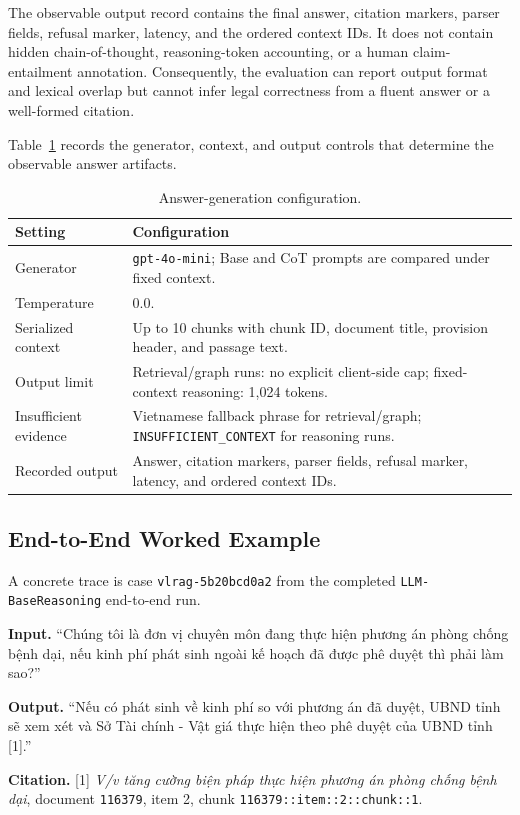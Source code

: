 The observable output record contains the final answer, citation markers,
parser fields, refusal marker, latency, and the ordered context IDs. It does
not contain hidden chain-of-thought, reasoning-token accounting, or a human
claim-entailment annotation. Consequently, the evaluation can report output
format and lexical overlap but cannot infer legal correctness from a fluent
answer or a well-formed citation.

Table~\ref{tab:generation-config} records the generator, context, and output
controls that determine the observable answer artifacts.

\begin{table}[t]
\centering
\scriptsize
\caption{Answer-generation configuration.}
\label{tab:generation-config}
\begin{tabularx}{\columnwidth}{@{}p{}X@{}}
\toprule
\textbf{Setting} & \textbf{Configuration} \\
\midrule
Generator & \texttt{gpt-4o-mini}; Base and CoT prompts are compared under fixed context. \\
Temperature & $0.0$. \\
Serialized context & Up to 10 chunks with chunk ID, document title, provision header, and passage text. \\
Output limit & Retrieval/graph runs: no explicit client-side cap; fixed-context reasoning: 1,024 tokens. \\
Insufficient evidence & Vietnamese fallback phrase for retrieval/graph; \texttt{INSUFFICIENT\_CONTEXT} for reasoning runs. \\
Recorded output & Answer, citation markers, parser fields, refusal marker, latency, and ordered context IDs. \\
\bottomrule
\end{tabularx}
\end{table}

\subsection{End-to-End Worked Example}
\label{sec:worked-example}

A concrete trace is case \texttt{vlrag-5b20bcd0a2} from the completed
\texttt{LLM-BaseReasoning} end-to-end run.

\textbf{Input.} ``Chúng tôi là đơn vị chuyên môn đang thực hiện phương án
phòng chống bệnh dại, nếu kinh phí phát sinh ngoài kế hoạch đã được phê duyệt
thì phải làm sao?''

\textbf{Output.} ``Nếu có phát sinh về kinh phí so với phương án đã duyệt,
UBND tỉnh sẽ xem xét và Sở Tài chính - Vật giá thực hiện theo phê duyệt của
UBND tỉnh [1].''

\textbf{Citation.} [1] \textit{V/v tăng cường biện pháp thực hiện phương án
phòng chống bệnh dại}, document \texttt{116379}, item 2, chunk
\texttt{116379::item::2::chunk::1}.
